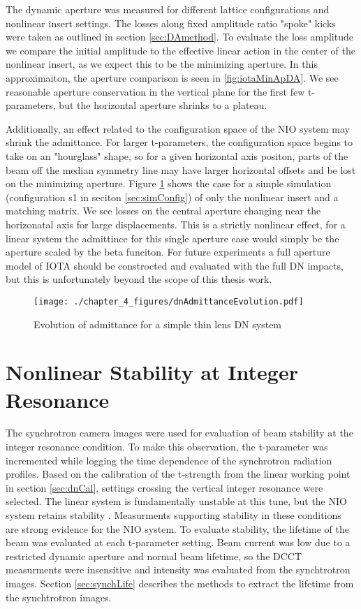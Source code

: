 The dynamic aperture was measured for different lattice configurations and nonlinear insert settings. The losses along fixed amplitude ratio "spoke" kicks were taken as outlined in section \ref{sec:DAmethod}. To evaluate the loss amplitude we compare the initial amplitude to the effective linear action in the center of the nonlinear insert, as we expect this to be the minimizing aperture. In this approximaiton, the aperture comparison is seen in \ref{fig:iotaMinApDA}. We see reasonable aperture conservation in the vertical plane for the first few t-parameters, but the horizontal aperture shrinks to a plateau.


Additionally, an effect related to the configuration space of the NIO system may shrink the admittance. For larger t-parameters, the configuration space begins to take on an "hourglass" shape, so for a given horizontal axis positon, parts of the beam off the median symmetry line may have larger horizontal offsets and be lost on the minimizing aperture. Figure \ref{fig:dnAdmitEvolve} shows the case for a simple simulation (configuration s1 in seciton \ref{sec:simConfig}) of only the nonlinear insert and a matching matrix. We see losses on the central aperture changing near the horizonatal axis for large displacements. This is a strictly nonlinear effect, for a linear system the admittince for this single aperture case would simply be the aperture scaled by the beta funciton. For future experiments a full aperture model of IOTA should be constrocted and evaluated with the full DN impacts, but this is unfortunately beyond the scope of this thesis work.

\begin{figure}
	\centering
	\texttt{[image: ./chapter\_4\_figures/dnAdmittanceEvolution.pdf]}
	\caption{Evolution of admittance for a simple thin lens DN system}
	\label{fig:dnAdmitEvolve}
\end{figure}


\section{Nonlinear Stability at Integer Resonance} \label{sec:intCross}
The synchrotron camera images were used for evaluation of beam stability at the integer resonance condition. To make this observation, the t-parameter was incremented while logging the time dependence of the synchrotron radiation profiles. Based on the calibration of the t-strength from the linear working point in section \ref{sec:dnCal}, settings crossing the vertical integer resonance were selected. The linear system is fundamentally unstable at this tune, but the NIO system retains stability . Measurments supporting stability in these conditions are strong evidence for the NIO system. To evaluate stability, the lifetime of the beam was evaluated at each t-parameter setting. Beam current was low due to a restricted dynamic aperture and normal beam lifetime, so the DCCT measurments were insensitive and intensity was evaluated from the synchtrotron images. Section \ref{sec:synchLife} describes the methods to extract the lifetime from the synchtrotron images.

